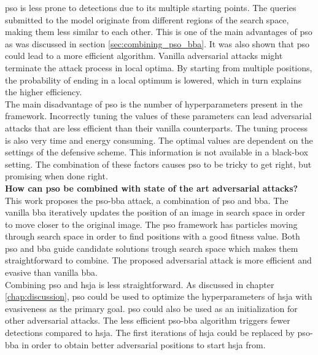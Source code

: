 \gls{pso} is less prone to detections due to its multiple starting points. The queries submitted to the model originate from different regions of the search space, making them less similar to each other. This is one of the main advantages of \gls{pso} as was discussed in section \ref{sec:combining_pso_bba}. It was also shown that \gls{pso} could lead to a more efficient algorithm. Vanilla adversarial attacks might terminate the attack process in local optima. By starting from multiple positions, the probability of ending in a local optimum is lowered, which in turn explains the higher efficiency.\\

The main disadvantage of \gls{pso} is the number of hyperparameters present in the framework. Incorrectly tuning the values of these parameters can lead adversarial attacks that are less efficient than their vanilla counterparts. The tuning process is also very time and energy consuming. The optimal values are dependent on the settings of the defensive scheme. This information is not available in a black-box setting. The combination of these factors causes \gls{pso} to be tricky to get right, but promising when done right.\\ 

	 
\textbf{How can \gls{pso} be combined with state of the art adversarial attacks?}\\
This work proposes the \gls{pso}-\gls{bba} attack, a combination of \gls{pso} and \gls{bba}. The vanilla \gls{bba} iteratively updates the position of an image in search space in order to move closer to the original image. The \gls{pso} framework has particles moving through search space in order to find positions with a good fitness value. Both \gls{pso} and \gls{bba} guide candidate solutions trough search space which makes them straightforward to combine. The proposed adversarial attack is more efficient and evasive than vanilla \gls{bba}.\\

Combining \gls{pso} and \gls{hsja} is less straightforward. As discussed in chapter \ref{chap:discussion}, \gls{pso} could be used to optimize the hyperparameters of \gls{hsja} with evasiveness as the primary goal. \gls{pso} could also be used as an initialization for other adversarial attacks. The less efficient \gls{pso}-\gls{bba} algorithm triggers fewer detections compared to \gls{hsja}. The first iterations of \gls{hsja} could be replaced by \gls{pso}-\gls{bba} in order to obtain better adversarial positions to start \gls{hsja} from.\\ 
	
